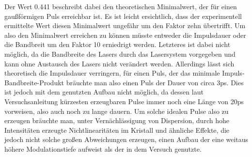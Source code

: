 Der Wert 0.441 beschreibt dabei den theoretischen Minimalwert, der für einen gaußförmigen Puls erreichbar ist. Es ist leicht ersichtlich, dass der experimentell ermittelte Wert diesen Minimalwert ungefähr um den Faktor zehn übertrifft. Um also den Minimalwert erreichen zu können müsste entweder die Impulsdauer oder die Bandbreit um den Faktor 10 erniedrigt werden. Letzteres ist dabei nicht möglich, da die Bandbreite des Lasers durch das Lasersystem vorgegeben und kann ohne Austausch des Lasers nicht verändert werden. Allerdings lässt sich theoretisch die Impulsdauer verringern, für einen Puls, der das minimale Impuls-Bandbreite-Produkt bräuchte man also einen Puls der Dauer von circa 3ps. Dies ist jedoch mit dem genutzten Aufbau nicht möglich, da dessen laut Versuchsanleitung kürzesten erzeugbaren Pulse immer noch eine Länge von 20ps vorweisen, also auch noch zu lange dauern. Um solche idealen Pulse also zu erzeugen bräuchte man, unter Vernächlässigung von Dispersion, durch hohe Intensitäten erzeugte Nichtlinearitäten im Kristall und ähnliche Effekte, die jedoch nicht solche großen Abweichungen erzeugen, einen Aufbau der eine weitaus höhere Modulationstiefe aufweist als der in dem Versuch genutzte.
